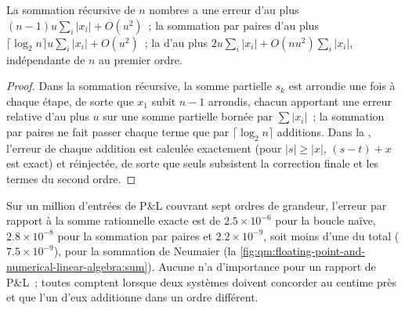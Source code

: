 \begin{proposition}\label{prop:qm:floating-point-and-numerical-linear-algebra:sum}
La sommation récursive de $n$ nombres a une erreur d'au plus $(n - 1)u\sum_i|x_i| + O(u^2)$~; la sommation par paires d'au plus $\lceil\log_2n\rceil u\sum_i|x_i| + O(u^2)$~; la  d'au plus
$2u\sum_i|x_i| + O(nu^2)\sum_i|x_i|$, indépendante de $n$ au premier ordre.
\end{proposition}

\begin{proof}
Dans la sommation récursive, la somme partielle $s_k$ est arrondie une fois à chaque étape, de sorte que $x_1$ subit $n - 1$ arrondis, chacun apportant une erreur relative d'au plus $u$ sur une somme partielle bornée par
$\sum|x_i|$~; la sommation par paires ne fait passer chaque terme que par $\lceil\log_2n\rceil$ additions. Dans la , l'erreur de chaque addition est calculée exactement (pour $|s| \ge |x|$,
$(s - t) + x$ est exact) et réinjectée, de sorte que seuls subsistent la correction finale et les termes du second ordre.
\end{proof}

Sur un million d'entrées de P\&L couvrant sept ordres de grandeur, l'erreur par rapport à la somme rationnelle exacte est de $2.5 \times 10^{-6}$ pour la boucle naïve, $2.8 \times 10^{-8}$ pour la sommation par paires
et $2.2 \times 10^{-9}$, soit moins d'une  du total ($7.5 \times 10^{-9}$), pour la sommation de Neumaier (la \cref{fig:qm:floating-point-and-numerical-linear-algebra:sum}). Aucune n'a d'importance pour un rapport de P\&L~; toutes
comptent lorsque deux systèmes doivent concorder au centime près et que l'un d'eux additionne dans un ordre différent.

